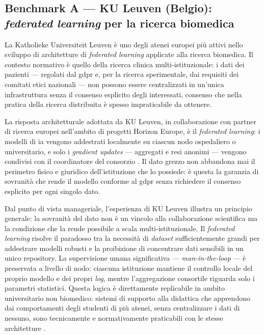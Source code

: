 \subsection{Benchmark A --- KU Leuven (Belgio): \textit{federated learning} per la ricerca
biomedica}

La Katholieke Universiteit Leuven è uno degli atenei europei più attivi nello sviluppo di
architetture di \textit{federated learning} applicate alla ricerca biomedica. Il contesto
normativo è quello della ricerca clinica multi-istituzionale: i dati dei pazienti ---
regolati dal \gls{gdpr} e, per la ricerca sperimentale, dai requisiti dei comitati etici
nazionali --- non possono essere centralizzati in un'unica infrastruttura senza il
consenso esplicito degli interessati, consenso che nella pratica della ricerca
distribuita è spesso impraticabile da ottenere.

La risposta architetturale adottata da KU Leuven, in collaborazione con partner di
ricerca europei nell'ambito di progetti Horizon Europe, è il \textit{federated learning}:
i modelli di \gls{ia} vengono addestrati localmente su ciascun nodo ospedaliero o
universitario, e solo i \textit{gradient updates} --- aggregati e resi anonimi ---
vengono condivisi con il coordinatore del consorzio \parencite{GadekalluFL2026}. Il dato
grezzo non abbandona mai il perimetro fisico e giuridico dell'istituzione che lo possiede:
è questa la garanzia di sovranità che rende il modello conforme al \gls{gdpr} senza richiedere
il consenso esplicito per ogni singolo dato.

Dal punto di vista manageriale, l'esperienza di KU Leuven illustra un principio generale:
la sovranità del dato non è un vincolo alla collaborazione scientifica ma la
condizione che la rende possibile a scala multi-istituzionale. Il \textit{federated
learning} risolve il paradosso tra la necessità di \textit{dataset} sufficientemente
grandi per addestrare modelli robusti e la proibizione di concentrare dati sensibili in
un unico repository. La supervisione umana significativa --- \textit{man-in-the-loop} ---
è preservata a livello di nodo: ciascuna istituzione mantiene il controllo locale del
proprio modello e dei propri \textit{log}, mentre l'aggregazione consortile riguarda
solo i parametri statistici. Questa logica è direttamente replicabile in ambito
universitario non biomedico: sistemi di supporto alla didattica che apprendono dai
comportamenti degli studenti di più atenei, senza centralizzare i dati di nessuno, sono
tecnicamente e normativamente praticabili con le stesse architetture
\parencite{GadekalluFL2026}.

